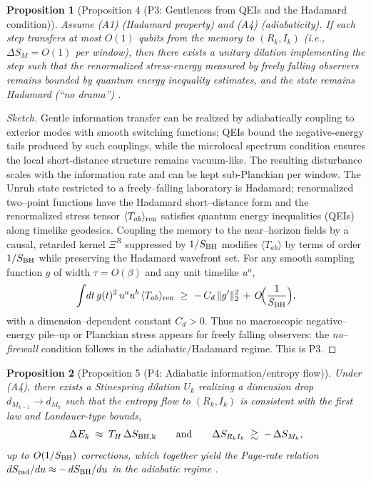 \documentclass[a4paper,11pt]{article}
\newcommand{\ie}{i.e.\xspace}
\theoremstyle{plain}
\newtheorem{proposition}{Proposition}
\theoremstyle{definition}
\theoremstyle{remark}
\begin{document}
\begin{proposition}[Proposition 4 (P3: Gentleness from QEIs and the Hadamard condition)]
\label{prop:P3-gentle}
Assume (A1) (Hadamard property) and (A4) (adiabaticity). If each step transfers at most $O(1)$ qubits from the memory to $(R_k,I_k)$
(\ie, $\Delta S_M=O(1)$ per window), then there exists a unitary dilation implementing the step such that the renormalized stress-energy
measured by freely falling observers remains bounded by quantum energy inequality estimates, and the state remains Hadamard
(``no drama'') \citep{Radzikowski:1996, Fewster:2012}.
\end{proposition}
\begin{proof}[Sketch]
Gentle information transfer can be realized by adiabatically coupling to exterior modes with smooth switching functions; QEIs bound the
negative-energy tails produced by such couplings, while the microlocal spectrum condition ensures the local short-distance structure
remains vacuum-like. The resulting disturbance scales with the information rate and can be kept sub-Planckian per window.
The Unruh state restricted to a freely--falling laboratory is Hadamard; renormalized two--point functions have the Hadamard short--distance form and the renormalized stress tensor $\langle T_{ab}\rangle_{\rm ren}$ satisfies quantum energy inequalities (QEIs) along timelike geodesics. Coupling the memory to the near--horizon fields by a causal, retarded kernel $\Xi^R$ suppressed by $1/S_{\rm BH}$ modifies $\langle T_{ab}\rangle$ by terms of order $1/S_{\rm BH}$ while preserving the Hadamard wavefront set. For any smooth sampling function $g$ of width $\tau=O(\beta)$ and any unit timelike $u^a$,
\begin{equation}
\int\!dt\,g(t)^2\,u^a u^b\,\langle T_{ab}\rangle_{\rm ren} \ \ge\ -\,C_d\,\|g'\|_2^2 \,+\,O\!\Big(\frac{1}{S_{\rm BH}}\Big),
\end{equation}
with a dimension--dependent constant $C_d>0$. Thus no macroscopic negative--energy pile--up or Planckian stress appears for freely falling observers: the \emph{no--firewall} condition follows in the adiabatic/Hadamard regime. This is P3.
\end{proof}
\begin{proposition}[Proposition 5 (P4: Adiabatic information/entropy flow)]
\label{prop:P4-adiabatic}
Under (A4), there exists a Stinespring dilation $U_k$ realizing a dimension drop $d_{M_{k-1}}\!\to d_{M_k}$ such that the entropy flow to
$(R_k,I_k)$ is consistent with the first law and Landauer-type bounds,
\[
\Delta E_k \;\approx\; T_H\,\Delta S_{\rm BH,k}\qquad\text{and}\qquad \Delta S_{R_k I_k}\;\gtrsim\; -\,\Delta S_{M_k},
\]
up to $O(1/S_{\rm BH})$ corrections, which together yield the Page-rate relation $dS_{\rm rad}/du \approx -\,dS_{\rm BH}/du$ in the
adiabatic regime \citep{Page:1993, BrownYork:1993, Brandao:2016}.
\end{proposition}
\end{document}
